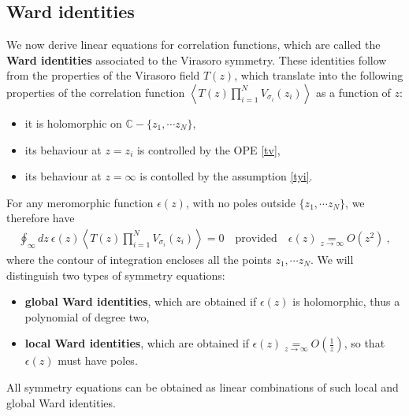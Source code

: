\documentclass[12pt,a4paper,notitlepage]{report}
\numberwithin{equation}{section}
\theoremstyle{break}
\begin{document}
\subsection{Ward identities \label{secswi}}

We now derive linear equations for correlation functions, which are called the \textbf{\boldmath Ward identities} associated to the Virasoro symmetry.
These identities follow from the properties of the Virasoro field $T(z)$, which translate into the following properties of the correlation function $\left\langle T(z)\prod_{i=1}^N V_{\sigma_i}(z_i) \right\rangle$ as a function of $z$:
\begin{itemize}
 \item it is holomorphic on ${\mathbb{C}}-\{z_1,\cdots z_N\}$,
\item its behaviour at $z=z_i$ is controlled by the OPE \eqref{tv},
\item its behaviour at $z=\infty$ is contolled by the assumption \eqref{tyi}.
\end{itemize}
For any meromorphic function $\epsilon(z)$, with no poles outside $\{z_1,\cdots z_N\}$, we therefore have
\begin{align}
 \oint_\infty dz\ \epsilon(z) \left\langle T(z)\prod_{i=1}^N V_{\sigma_i}(z_i) \right\rangle = 0 \quad \text{provided} \quad \epsilon(z)\underset{z\rightarrow\infty}{=} O(z^2)\ ,
\label{oiz}
\end{align}
where the contour of integration encloses all the points $z_1,\cdots z_N$.
We will distinguish two types of symmetry equations:
\begin{itemize}
 \item \textbf{\boldmath global Ward identities}, which are obtained if $\epsilon(z)$ is holomorphic, thus a polynomial of degree two, 
\item \textbf{\boldmath local Ward identities}, which are obtained if $\epsilon(z) \underset{z\rightarrow\infty}{=} O(\frac{1}{z})$, so that $\epsilon(z)$ must have poles.
\end{itemize}
All symmetry equations can be obtained as linear combinations of such local and global Ward identities.
\end{document}
